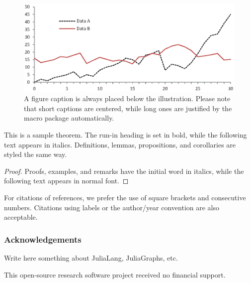 \documentclass[runningheads]{llncs}
\begin{document}
\begin{figure}
\includegraphics[width=\textwidth]{fig1.eps}
\caption{A figure caption is always placed below the illustration.
Please note that short captions are centered, while long ones are
justified by the macro package automatically.} \label{fig1}
\end{figure}

\begin{theorem}
This is a sample theorem. The run-in heading is set in bold, while
the following text appears in italics. Definitions, lemmas,
propositions, and corollaries are styled the same way.
\end{theorem}
%
%
\begin{proof}
Proofs, examples, and remarks have the initial word in italics,
while the following text appears in normal font.
\end{proof}
For citations of references, we prefer the use of square brackets
and consecutive numbers. Citations using labels or the author/year
convention are also acceptable. 

\cite{DeDomenico2013,Kivela2014,Bianconi2018}

\subsubsection{Acknowledgements} 

Write here something about JuliaLang, JuliaGraphs, etc.

This open-source research software project received no financial support.


%
%


\end{document}
